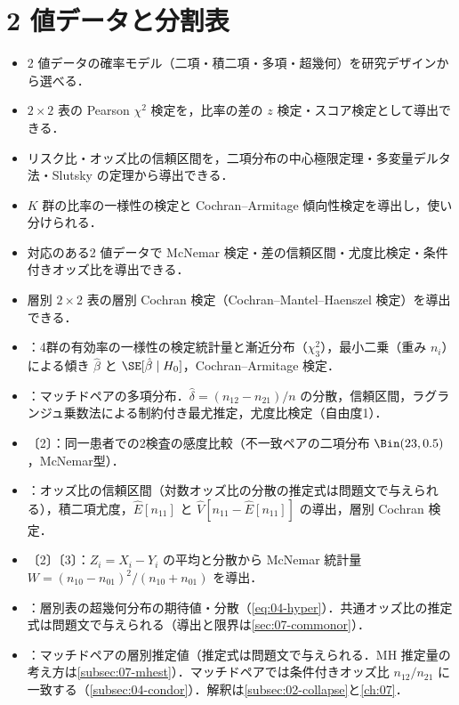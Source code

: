 \chapter{2 値データと分割表}\label{ch:04}

\begin{goalbox}
\begin{itemize}
\item 2 値データの確率モデル（二項・積二項・多項・超幾何）を研究デザインから選べる．
\item $2\times2$ 表の Pearson $\chi^2$ 検定を，比率の差の $z$ 検定・スコア検定として導出できる．
\item リスク比・オッズ比の信頼区間を，二項分布の中心極限定理・多変量デルタ法・Slutsky の定理から導出できる．
\item $K$ 群の比率の一様性の検定と Cochran--Armitage 傾向性検定を導出し，使い分けられる．
\item 対応のある2 値データで McNemar 検定・差の信頼区間・尤度比検定・条件付きオッズ比を導出できる．
\item 層別 $2\times2$ 表の層別 Cochran 検定（Cochran--Mantel--Haenszel 検定）を導出できる．
\end{itemize}
\end{goalbox}

\begin{exambox}
\begin{itemize}
\item {}：4群の有効率の一様性の検定統計量と漸近分布（$\chi^2_3$），最小二乗（重み $n_i$）による傾き $\hat\beta$ と $\SE[\hat\beta\mid H_0]$，Cochran--Armitage 検定．
\item {}：マッチドペアの多項分布．$\hat\delta=(n_{12}-n_{21})/n$ の分散，信頼区間，ラグランジュ乗数法による制約付き最尤推定，尤度比検定（自由度1）．
\item {}〔2〕：同一患者での2検査の感度比較（不一致ペアの二項分布 $\Bin(23,0.5)$，McNemar型）．
\item {}：オッズ比の信頼区間（対数オッズ比の分散の推定式は問題文で与えられる），積二項尤度，$\hat E[n_{11}]$ と $\hat V[n_{11}-\hat E[n_{11}]]$ の導出，層別 Cochran 検定．
\item {}〔2〕〔3〕：$Z_i=X_i-Y_i$ の平均と分散から McNemar 統計量 $W=(n_{10}-n_{01})^2/(n_{10}+n_{01})$ を導出．
\item {}：層別表の超幾何分布の期待値・分散（\cref{eq:04-hyper}）．共通オッズ比の推定式は問題文で与えられる（導出と限界は\cref{sec:07-commonor}）．
\item {}：マッチドペアの層別推定値（推定式は問題文で与えられる．MH 推定量の考え方は\cref{subsec:07-mhest}）．マッチドペアでは条件付きオッズ比 $n_{12}/n_{21}$ に一致する（\cref{subsec:04-condor}）．解釈は\cref{subsec:02-collapse}と\cref{ch:07}．
\end{itemize}
\end{exambox}

